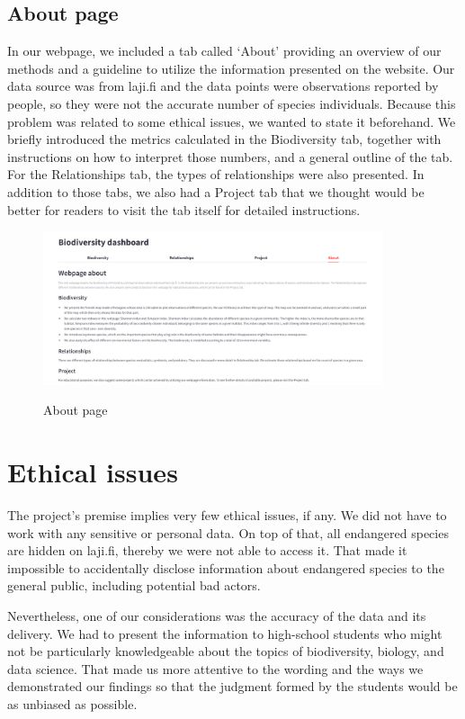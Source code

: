 \documentclass{article}
\begin{document}
\subsection{About page}
In our webpage, we included a tab called ‘About’ providing an overview of our methods and a guideline to utilize the information presented on the website. Our data source was from laji.fi and the data points were observations reported by people, so they were not the accurate number of species individuals. Because this problem was related to some ethical issues, we wanted to state it beforehand. We briefly introduced the metrics calculated in the Biodiversity tab, together with instructions on how to interpret those numbers, and a general outline of the tab. For the Relationships tab, the types of relationships were also presented. In addition to those tabs, we also had a Project tab that we thought would be better for readers to visit the tab itself for detailed instructions.
\begin{figure}[h]
	\centering
	\includegraphics[width=10cm]{about_page}\label{about_page}
	\vspace*{-2mm}
	\caption{About page}
\end{figure}
\newpage
\section{Ethical issues}
The project’s premise implies very few ethical issues, if any. We did not have to work with any sensitive or personal data. On top of that, all endangered species are hidden on laji.fi, thereby we were not able to access it. That made it impossible to accidentally disclose information about endangered species to the general public, including potential bad actors.
\par
Nevertheless, one of our considerations was the accuracy of the data and its delivery. We had to present the information to high-school students who might not be particularly knowledgeable about the topics of biodiversity, biology, and data science. That made us more attentive to the wording and the ways we demonstrated our findings so that the judgment formed by the students would be as unbiased as possible.
\end{document}
